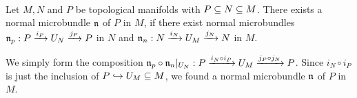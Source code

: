 \begin{lemma}
 \\
Let $M, N$ and $P$ be topological manifolds with $P \sub N \sub M$.
There exists a normal microbundle $\bn$ of $P$ in $M$, if
there exist normal microbundles $\bn_p: \bundle{P}{U_N}{i_P}{j_P}$ in $N$ and $\bn_n: \bundle{N}{U_M}{i_N}{j_N}$ in $M$.
\end{lemma}
\begin{myproof}
We simply form the composition $\bn_p \circ \bn_n\restr{U_N}: \bundle{P}{U_M}{i_N \circ i_P}{j_P \circ j_N}$.
Since $i_N \circ i_P$ is just the inclusion of $P \incl U_M \sub M$, we found a normal microbundle $\bn$ of $P$ in $M$.
\end{myproof}